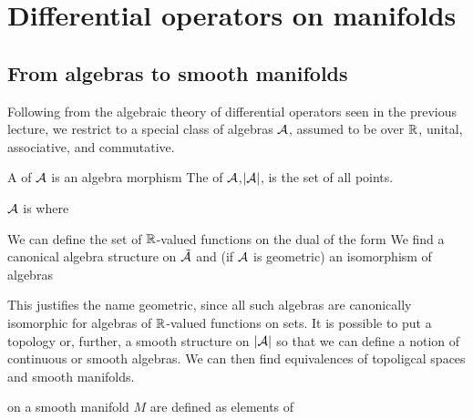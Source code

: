 \documentclass{article}
\begin{document}
\section{Differential operators on manifolds}
\subsection{From algebras to smooth manifolds}
Following from the algebraic theory of differential operators seen in the previous lecture, we restrict to a special class of algebras $\mathcal{A}$, assumed to be over $\mathbb{R}$, unital, associative, and commutative. 

\begin{definition}
A  of $\mathcal{A}$ is an algebra morphism 
The  of $\mathcal{A}$,$\left\lvert \mathcal{A} \right\rvert$, is the set of all points. 
\end{definition}

\begin{definition}
$\mathcal{A}$ is  where 
\end{definition}

We can define the set of $\mathbb{R}$-valued functions on the dual of the form 
We find a canonical algebra structure on $\tilde{\mathcal{A}}$ and (if $\mathcal{A}$ is geometric) an isomorphism of algebras 
\begin{remark}
This justifies the name geometric, since all such algebras are canonically isomorphic for algebras of $\mathbb{R}$-valued functions on sets. It is possible to put a topology or, further, a smooth structure on $\left\lvert \mathcal{A} \right\rvert$ so that we can define a notion of continuous or smooth algebras. We can then find equivalences of topoligcal spaces and smooth manifolds. 
\end{remark}

\begin{definition}
 on a smooth manifold $M$ are defined as elements of 
\end{definition}
\end{document}
